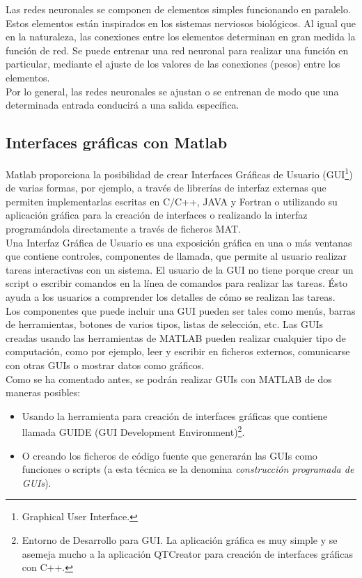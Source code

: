 			Las redes neuronales se componen de elementos simples funcionando en paralelo. Estos elementos están inspirados en los  sistemas nerviosos biológicos. Al igual que en la naturaleza, las conexiones entre los elementos determinan en gran medida la función de red. Se puede entrenar una red neuronal para realizar una función en particular, mediante el ajuste de los valores de las conexiones (pesos) entre los elementos.\\

			Por lo general, las redes neuronales se ajustan o se entrenan de modo que una determinada entrada conducirá a una salida específica.
			
		\subsection{Interfaces gráficas con Matlab}
			
			Matlab proporciona la posibilidad de crear Interfaces Gráficas de Usuario (GUI\footnote{Graphical User Interface.}) de varias formas, por ejemplo, a través de librerías de interfaz externas que permiten implementarlas escritas en C/C++, JAVA y Fortran o utilizando su aplicación gráfica para la creación de interfaces o realizando la interfaz programándola directamente a través de ficheros MAT.\\
			
			Una Interfaz Gráfica de Usuario es una exposición gráfica en una o más ventanas que contiene controles, componentes de llamada, que permite al usuario realizar tareas interactivas con un sistema. El usuario de la GUI no tiene porque crear un script o escribir comandos en la línea de comandos para realizar las tareas. Ésto ayuda a los usuarios a comprender los detalles de cómo se realizan las tareas.\\
			
			Los componentes que puede incluir una GUI pueden ser tales como menús, barras de herramientas, botones de varios tipos, listas de selección, etc. Las GUIs creadas usando las herramientas de MATLAB pueden realizar cualquier tipo de computación, como por ejemplo, leer y escribir en ficheros externos, comunicarse con otras GUIs o mostrar datos como gráficos.\\
			
			Como se ha comentado antes, se podrán realizar GUIs con MATLAB de dos maneras posibles:
			
			\begin{itemize}
				\item Usando la herramienta para creación de interfaces gráficas que contiene llamada GUIDE (GUI Development Environment)\footnote{Entorno de Desarrollo para GUI. La aplicación gráfica es muy simple y se asemeja mucho a la aplicación QTCreator para creación de interfaces gráficas con C++.}.
				\item O creando los ficheros de código fuente que generarán las GUIs como funciones o scripts (a esta técnica se la denomina \textit{construcción programada de GUIs}).
			\end{itemize}
